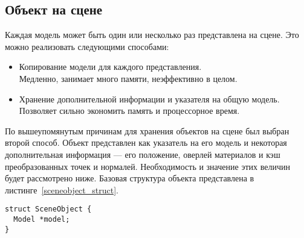 \documentclass[a4paper,12pt]{report}
\numberwithin{equation}{section}
\begin{document}
\subsection{Объект на сцене}
Каждая модель может быть один или несколько раз представлена на сцене. Это можно реализовать следующими способами:
\begin{itemize}
\item Копирование модели для каждого представления. \\
Медленно, занимает много памяти, неэффективно в целом.
\item Хранение дополнительной информации и указателя на общую модель. \\
Позволяет сильно экономить память и процессорное время.
\end{itemize}
По вышеупомянутым причинам для хранения объектов на сцене был выбран второй способ. Объект представлен как указатель на его модель и некоторая дополнительная информация --- его положение, оверлей материалов и кэш преобразованных точек и нормалей. Необходимость и значение этих величин будет рассмотрено ниже. Базовая структура объекта представлена в листинге~\ref{sceneobject_struct}.

\begin{lstlisting}[float=h,caption={Структура данных ``Объект на сцене''},label=sceneobject_struct]
struct SceneObject {
  Model *model;
}
\end{lstlisting}
\end{document}
